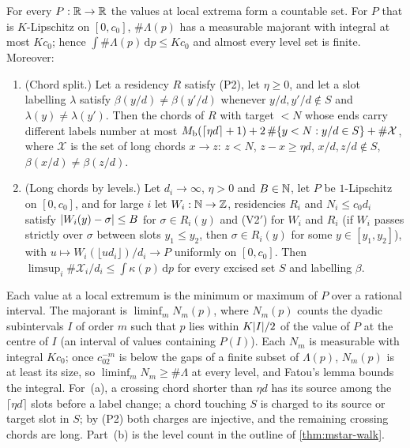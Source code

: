 \begin{lemma}\label{lem:analysis}
For every $P:\mathbb{R}\to\mathbb{R}$ the values at local extrema form a countable set. For $P$ that is
$K$-Lipschitz on $[0,c_0]$, $\#\Lambda(p)$ has a measurable majorant with integral at most $Kc_0$;
hence $\int\#\Lambda(p)\,\mathrm{d}p\le Kc_0$ and almost every level set is finite. Moreover:
\begin{enumerate}[label=(\alph*)]
\item (Chord split.) Let a residency $R$ satisfy (P2), let $\eta\ge0$, and let a slot labelling
$\lambda$ satisfy $\beta(y/d)\ne\beta(y'/d)$ whenever $y/d,y'/d\notin S$ and $\lambda(y)\ne\lambda(y')$.
Then the chords of $R$ with target $<N$ whose ends carry different labels number at most
$M_{\mathrm{b}}(\lceil\eta d\rceil+1)+2\,\#\{y<N:y/d\in S\}+\#\mathcal X$, where $\mathcal X$ is the set of
long chords $x\to z$: $z<N$, $z-x\ge\eta d$, $x/d,z/d\notin S$, $\beta(x/d)\ne\beta(z/d)$.
\item (Long chords by levels.) Let $d_i\to\infty$, $\eta>0$ and $B\in\mathbb{N}$, let $P$ be $1$-Lipschitz on $[0,c_0]$,
and for large $i$ let $W_i:\mathbb{N}\to\mathbb{Z}$, residencies $R_i$ and $N_i\le c_0d_i$ satisfy $\lvert W_i(y)-\sigma \rvert\le B$ for
$\sigma\in R_i(y)$ and (V2$'$) for $W_i$ and $R_i$ (if $W_i$ passes strictly over $\sigma$ between slots $y_1\le y_2$,
then $\sigma\in R_i(y)$ for some $y\in[y_1,y_2]$), with $u\mapsto W_i(\lfloor ud_i\rfloor)/d_i\to P$ uniformly on $[0,c_0]$.
Then $\limsup_i\#\mathcal X_i/d_i\le\int\kappa(p)\,\mathrm{d}p$ for every excised set $S$ and labelling $\beta$.
\end{enumerate}
\end{lemma}

\begin{outline}
Each value at a local extremum is the minimum or maximum of $P$ over a rational interval. The
majorant is $\liminf_mN_m(p)$, where $N_m(p)$ counts the dyadic subintervals $I$ of order $m$ such that $p$
lies within $K\lvert I \rvert/2$ of the value of $P$ at the centre of $I$ (an interval of values containing $P(I)$).
Each $N_m$ is measurable with integral $Kc_0$; once $c_02^{-m}$ is below the gaps of a finite subset of
$\Lambda(p)$, $N_m(p)$ is at least its size, so $\liminf_mN_m\ge\#\Lambda$ at every level, and Fatou's lemma
bounds the integral. For~(a), a crossing chord shorter than $\eta d$ has its source among the
$\lceil\eta d\rceil$ slots before a label change; a chord touching $S$ is charged to its source or target slot
in $S$; by (P2) both charges are injective, and the remaining crossing chords are long. Part~(b) is the level
count in the outline of \cref{thm:mstar-walk}.
\end{outline}

